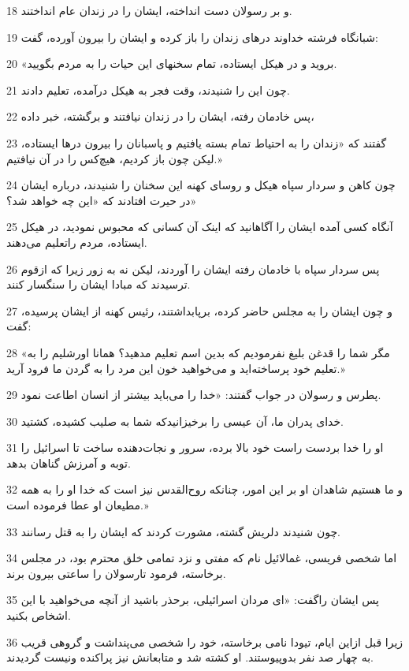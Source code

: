 \par 18 و بر رسولان دست انداخته، ایشان را در زندان عام انداختند.
\par 19 شبانگاه فرشته خداوند درهای زندان را باز کرده و ایشان را بیرون آورده، گفت:
\par 20 «بروید و در هیکل ایستاده، تمام سخنهای این حیات را به مردم بگویید.
\par 21 چون این را شنیدند، وقت فجر به هیکل درآمده، تعلیم دادند.
\par 22 پس خادمان رفته، ایشان را در زندان نیافتند و برگشته، خبر داده،
\par 23 گفتند که «زندان را به احتیاط تمام بسته یافتیم و پاسبانان را بیرون درها ایستاده، لیکن چون باز کردیم، هیچ‌کس را در آن نیافتیم.»
\par 24 چون کاهن و سردار سپاه هیکل و روسای کهنه این سخنان را شنیدند، درباره ایشان در حیرت افتادند که «این چه خواهد شد؟»
\par 25 آنگاه کسی آمده ایشان را آگاهانید که اینک آن کسانی که محبوس نمودید، در هیکل ایستاده، مردم راتعلیم می‌دهند.
\par 26 پس سردار سپاه با خادمان رفته ایشان را آوردند، لیکن نه به زور زیرا که ازقوم ترسیدند که مبادا ایشان را سنگسار کنند.
\par 27 و چون ایشان را به مجلس حاضر کرده، برپابداشتند، رئیس کهنه از ایشان پرسیده، گفت:
\par 28 «مگر شما را قدغن بلیغ نفرمودیم که بدین اسم تعلیم مدهید؟ همانا اورشلیم را به تعلیم خود پرساخته‌اید و می‌خواهید خون این مرد را به گردن ما فرود آرید.»
\par 29 پطرس و رسولان در جواب گفتند: «خدا را می‌باید بیشتر از انسان اطاعت نمود.
\par 30 خدای پدران ما، آن عیسی را برخیزانیدکه شما به صلیب کشیده، کشتید.
\par 31 او را خدا بردست راست خود بالا برده، سرور و نجات‌دهنده ساخت تا اسرائیل را توبه و آمرزش گناهان بدهد.
\par 32 و ما هستیم شاهدان او بر این امور، چنانکه روح‌القدس نیز است که خدا او را به همه مطیعان او عطا فرموده است.»
\par 33 چون شنیدند دلریش گشته، مشورت کردند که ایشان را به قتل رسانند.
\par 34 اما شخصی فریسی، غمالائیل نام که مفتی و نزد تمامی خلق محترم بود، در مجلس برخاسته، فرمود تارسولان را ساعتی بیرون برند.
\par 35 پس ایشان راگفت: «ای مردان اسرائیلی، برحذر باشید از آنچه می‌خواهید با این اشخاص بکنید.
\par 36 زیرا قبل ازاین ایام، تیودا نامی برخاسته، خود را شخصی می‌پنداشت و گروهی قریب به چهار صد نفر بدوپیوستند. او کشته شد و متابعانش نیز پراکنده ونیست گردیدند.

